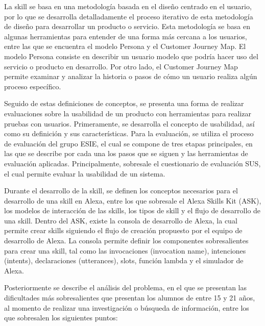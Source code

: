 La skill se basa en una metodología basada en el diseño centrado en el usuario, por lo que se desarrolla detalladamente el proceso iterativo de esta metodología de diseño para desarrollar un producto o servicio. Esta metodología se basa en algunas herramientas para entender de una forma más cercana a los usuarios, entre las que se encuentra el modelo Persona y el Customer Journey Map. El modelo Persona consiste en describir un usuario modelo que podría hacer uso del servicio o producto en desarrollo. Por otro lado, el Customer Journey Map permite examinar y analizar la historia o pasos de cómo un usuario realiza algún proceso específico.

Seguido de estas definiciones de conceptos, se presenta una forma de realizar evaluaciones sobre la usabilidad de un producto con herramientas para realizar pruebas con usuarios. Primeramente, se desarrolla el concepto de usabilidad, así como su definición y sus características. Para la evaluación, se utiliza el proceso de evaluación del grupo ESIE, el cual se compone de tres etapas principales, en las que se describe por cada una los pasos que se siguen y las herramientas de evaluación aplicadas. Principalmente, sobresale el cuestionario de evaluación SUS, el cual permite evaluar la usabilidad de un sistema.

Durante el desarrollo de la skill, se definen los conceptos necesarios para el desarrollo de una skill en Alexa, entre los que sobresale el Alexa Skills Kit (ASK), los modelos de interacción de las skills, los tipos de skill y el flujo de desarrollo de una skill. Dentro del ASK, existe la consola de desarrollo de Alexa, la cual permite crear skills siguiendo el flujo de creación propuesto por el equipo de desarrollo de Alexa. La consola permite definir los componentes sobresalientes para crear una skill, tal como las invocaciones (invocation name), intenciones (intents), declaraciones (utterances), slots, función lambda y el simulador de Alexa.

Posteriormente se describe el análisis del problema, en el que se presentan las dificultades más sobresalientes que presentan los alumnos de entre 15 y 21 años, al momento de realizar una investigación o búsqueda de información, entre los que sobresalen los siguientes puntos:


